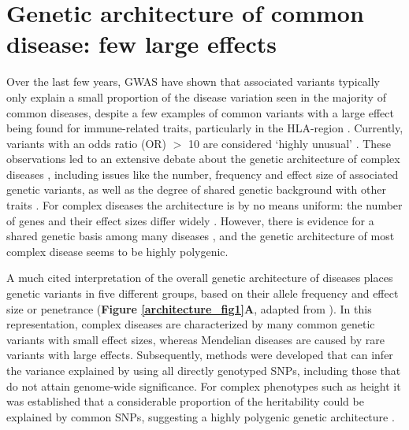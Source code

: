 \section{Genetic architecture of common disease: few large effects}
Over the last few years, GWAS have shown that associated variants typically only explain a small proportion of the disease variation seen in the majority of common diseases, despite a few examples of common variants with a large effect being found for immune-related traits, particularly in the HLA-region \cite{dalyHLAB5701Genotype2009}. Currently, variants with an odds ratio (OR) $>$ 10 are considered ‘highly unusual’ \cite{mccarthyGenomewideAssociationStudies2008}. These observations led to an extensive debate about the genetic architecture of complex diseases \cite{mccarthyGenomewideAssociationStudies2008,hansenEvolutionGeneticArchitecture2006,devlinGeneticArchitectureAutism2012,lohContrastingGeneticArchitectures2015,fuchsbergerGeneticArchitectureType2016}, including issues like the number, frequency and effect size of associated genetic variants, as well as the degree of shared genetic background with other traits \cite{mackayGeneticArchitectureQuantitative2001}. For complex diseases the architecture is by no means uniform: the number of genes and their effect sizes differ widely \cite{lohContrastingGeneticArchitectures2015,fuchsbergerGeneticArchitectureType2016,HiddenComplexityMendelian,rheenenGenomewideAssociationAnalyses2016}. However, there is evidence for a shared genetic basis among many diseases \cite{zhernakovaDetectingSharedPathogenesis2009,pickrellDetectionInterpretationShared2016,shiContrastingGeneticArchitecture2016}, and the genetic architecture of most complex disease seems to be highly polygenic.

A much cited interpretation of the overall genetic architecture of diseases places genetic variants in five different groups, based on their allele frequency and effect size or penetrance (\textbf{Figure \ref{architecture_fig1}A}, adapted from \cite{mccarthyGenomewideAssociationStudies2008,manolioFindingMissingHeritability2009}). In this representation, complex diseases are characterized by many common genetic variants with small effect sizes, whereas Mendelian diseases are caused by rare variants with large effects. Subsequently, methods were developed that can infer the variance explained by using all directly genotyped SNPs, including those that do not attain genome-wide significance. For complex phenotypes such as height it was established that a considerable proportion of the heritability could be explained by common SNPs, suggesting a highly polygenic genetic architecture \cite{yangCommonSNPsExplain2010}.

